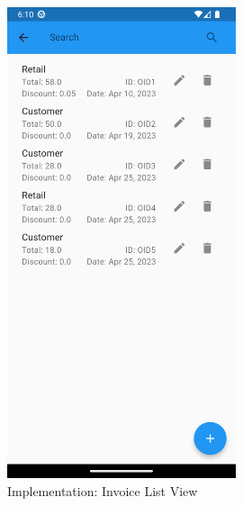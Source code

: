 \documentclass[../thesis.tex]{subfiles}
\begin{document}
\begin{figure}[H]
    \centering
    \includegraphics[width=0.60\textwidth]{images/InvoiceScreen_List.png}
    \caption{Implementation: Invoice List View }
    \label{fig:InvoiceScreen_List}
\end{figure}
\end{document}
